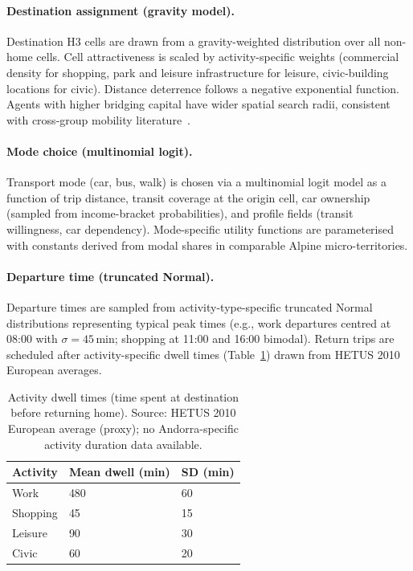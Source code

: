 \documentclass[sustainability,article,submit,pdftex,moreauthors]{Definitions/mdpi}
\begin{document}
\paragraph{Destination assignment (gravity model).}
Destination H3 cells are drawn from a gravity-weighted distribution over
all non-home cells. Cell attractiveness is scaled by activity-specific
weights (commercial density for shopping, park and leisure infrastructure
for leisure, civic-building locations for civic). Distance deterrence follows
a negative exponential function. Agents with higher bridging capital have
wider spatial search radii, consistent with cross-group mobility
literature~\cite{putnam2000bowling}.

\paragraph{Mode choice (multinomial logit).}
Transport mode (car, bus, walk) is chosen via a multinomial logit model
as a function of trip distance, transit coverage at the origin cell, car
ownership (sampled from income-bracket probabilities), and profile fields
(transit willingness, car dependency). Mode-specific utility functions are
parameterised with constants derived from modal shares in comparable
Alpine micro-territories.

\paragraph{Departure time (truncated Normal).}
Departure times are sampled from activity-type-specific truncated Normal
distributions representing typical peak times (e.g., work departures
centred at 08:00 with $\sigma = 45$\,min; shopping at 11:00 and 16:00
bimodal). Return trips are scheduled after activity-specific dwell times
(Table~\ref{tab:dwell}) drawn from HETUS 2010 European averages.

\begin{table}[H]
\caption{Activity dwell times (time spent at destination before returning home).
Source: HETUS 2010 European average (proxy); no Andorra-specific
activity duration data available.}
\label{tab:dwell}
\begin{tabularx}{\textwidth}{lXX}
\toprule
\textbf{Activity} & \textbf{Mean dwell (min)} & \textbf{SD (min)} \\
\midrule
Work     & 480 & 60 \\
Shopping &  45 & 15 \\
Leisure  &  90 & 30 \\
Civic    &  60 & 20 \\
\bottomrule
\end{tabularx}
\end{table}
\end{document}
